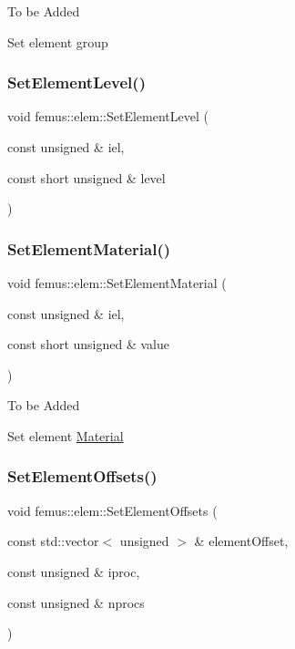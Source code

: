 To be Added

Set element group \mbox{\label{classfemus_1_1elem_afd4939bacbd662d8b95fbc617d5e2d50}} 
\subsubsection{\texorpdfstring{Set\+Element\+Level()}{SetElementLevel()}}
{\footnotesize\ttfamily void femus\+::elem\+::\+Set\+Element\+Level (\begin{DoxyParamCaption}\item[{const unsigned \&}]{iel,  }\item[{const short unsigned \&}]{level }\end{DoxyParamCaption})\hspace{0.3cm}{\ttfamily [inline]}}

\mbox{\label{classfemus_1_1elem_a5a00f23f650334a2b35ab8808bb4f1e0}} 
\subsubsection{\texorpdfstring{Set\+Element\+Material()}{SetElementMaterial()}}
{\footnotesize\ttfamily void femus\+::elem\+::\+Set\+Element\+Material (\begin{DoxyParamCaption}\item[{const unsigned \&}]{iel,  }\item[{const short unsigned \&}]{value }\end{DoxyParamCaption})}

To be Added

Set element \mbox{\hyperlink{classfemus_1_1_material}{Material}} \mbox{\label{classfemus_1_1elem_ac1a51ee2ade3b0cea57ba1a57e1c003d}} 
\subsubsection{\texorpdfstring{Set\+Element\+Offsets()}{SetElementOffsets()}}
{\footnotesize\ttfamily void femus\+::elem\+::\+Set\+Element\+Offsets (\begin{DoxyParamCaption}\item[{const std\+::vector$<$ unsigned $>$ \&}]{element\+Offset,  }\item[{const unsigned \&}]{iproc,  }\item[{const unsigned \&}]{nprocs }\end{DoxyParamCaption})\hspace{0.3cm}{\ttfamily [inline]}}

